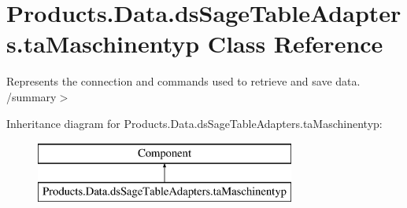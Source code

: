\hypertarget{class_products_1_1_data_1_1ds_sage_table_adapters_1_1ta_maschinentyp}{}\section{Products.\+Data.\+ds\+Sage\+Table\+Adapters.\+ta\+Maschinentyp Class Reference}
\label{class_products_1_1_data_1_1ds_sage_table_adapters_1_1ta_maschinentyp}


Represents the connection and commands used to retrieve and save data. /summary$>$  


Inheritance diagram for Products.\+Data.\+ds\+Sage\+Table\+Adapters.\+ta\+Maschinentyp\+:\begin{figure}[H]
\begin{center}
\leavevmode
\includegraphics[height=2.000000cm]{class_products_1_1_data_1_1ds_sage_table_adapters_1_1ta_maschinentyp}
\end{center}
\end{figure}

